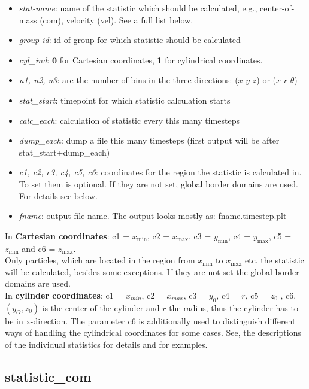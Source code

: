 \begin{itemize}
\item \textit{stat-name}: name of the statistic which should be calculated, e.g., center-of-mass (com), velocity (vel). See a full list below.
\item \textit{group-id}: id of group for which statistic should be calculated
\item \textit{cyl\_ind}: $\textbf{0}$ for Cartesian coordinates, {\bfseries 1} for cylindrical coordinates.
\item \textit{n1, n2, n3}: are the number of bins in the three directions: ($x$ $y$ $z$) or ($x$ $r$ $\theta$)
\item \textit{stat\_start}: timepoint for which statistic calculation starts
\item \textit{calc\_each}: calculation of statistic every this many timesteps
\item \textit{dump\_each}: dump a file this many timesteps (first output will be after stat\_start+dump\_each)
\item \textit{c1, c2, c3, c4, c5, c6}: coordinates for the region the statistic is calculated in. To set them is optional. If they are not set, global border domains are used. For details see below.
\item \textit{fname}: output file name. The output looks mostly as: fname.timestep.plt
\end{itemize}

In \textbf{Cartesian coordinates}: c1 = $x_\mathrm{min}$, c2 = $x_\mathrm{max}$, c3 = $y_\mathrm{min}$, c4 = $y_\mathrm{max}$, c5 = $z_\mathrm{min} $ and c6 = $z_\mathrm{max}$.\\
Only particles, which are located in the region from $x_\mathrm{min}$ to $x_\mathrm{max}$ etc. the statistic will be calculated, besides some exceptions.
If they are not set the global border domains are used.
\\[2ex]
In \textbf{cylinder coordinates}: c1 = $x_{min}$, c2 = $x_{max}$, c3 = $y_0$, c4 = $r$, c5 = $z_0$ , c6.\\
$(y_O, z_0)$ is the center of the cylinder and $r$ the radius, thus the cylinder has to be in x-direction.
The parameter c6 is additionally used to distinguish different ways of handling the cylindrical coordinates for some cases.
See, the descriptions of the individual statistics for details and for examples.


\subsection{statistic\_com}

